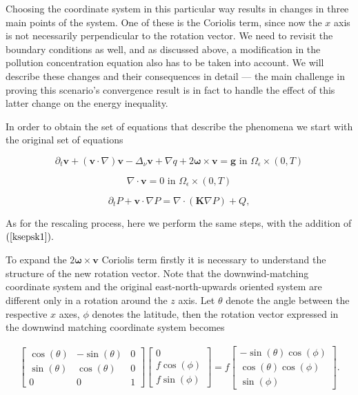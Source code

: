 \documentclass[11pt]{article}
\begin{document}
Choosing the coordinate system in this particular way results in changes in three main points of the system. One of these is the Coriolis term, since now the $x$ axis is not necessarily perpendicular to the rotation vector. We need to revisit the boundary conditions as well, and as discussed above, a modification in the pollution concentration equation also has to be taken into account. We will describe these changes and their consequences in detail --- the main challenge in proving this scenario's convergence result is in fact to handle the effect of this latter change on the energy inequality.

In order to obtain the set of equations that describe the phenomena we start with the original set of equations

\begin{equation} \label{originalEQ-V}
  \partial_t \mathbf{v} + (\mathbf{v} \cdot \nabla)\mathbf{v} -\Delta_{\nu} \mathbf{v} + \nabla q + 2 \mathbf{\omega} \times \mathbf{v}= \mathbf{g} \text{ in } \Omega_{\epsilon} \times (0,T)
\end{equation}
    
\begin{equation} \label{originalEQ-I}
  \nabla \cdot \mathbf{v} = 0 \text{ in } \Omega_{\epsilon} \times (0,T)
\end{equation}
    
\begin{equation} \label{diffusive}
  \partial_t P + \mathbf{v} \cdot \nabla P = \nabla \cdot (\mathbf{K} \nabla P) + Q,
\end{equation}

As for the rescaling process, here we perform the same steps, with the addition of $(\ref{ksepsk1}).$

To expand the $2 \mathbf{\omega} \times \mathbf{v}$ Coriolis term firstly it is necessary to understand the structure of the new rotation vector. Note that the downwind-matching coordinate system and the original east-north-upwards oriented system are different only in a rotation around the $z$ axis. Let $\theta$ denote the angle between the respective $x$ axes, $\phi$ denotes the latitude, then the rotation vector expressed in the downwind matching coordinate system becomes

\begin{gather}
 \begin{bmatrix} \cos(\theta) & -\sin(\theta) & 0 \\ \sin(\theta) & \cos(\theta) & 0 \\ 0 & 0 & 1 \end{bmatrix} \begin{bmatrix} 0 \\ f \cos(\phi) \\ f \sin(\phi) \end{bmatrix}
 =
  f \begin{bmatrix} -\sin(\theta)\cos(\phi) \\ \cos(\theta) \cos(\phi) \\ \sin(\phi) \end{bmatrix}.
\end{gather}
\end{document}
